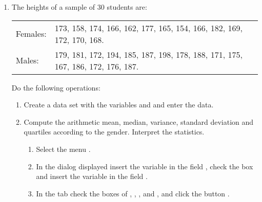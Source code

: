 \begin{enumerate}[leftmargin=*]
\item The heights of a sample of 30 students are:
\begin{center}
\begin{tabular}{ll}
Females: & 173, 158, 174, 166, 162, 177, 165, 154, 166, 182, 169, 172, 170, 168. \\
Males: & 179, 181, 172, 194, 185, 187, 198, 178, 188, 171, 175, 167, 186, 172, 176, 187.
\end{tabular}
\end{center}

Do the following operations:
\begin{enumerate}
\item Create a data set with the variables  and  and enter the data.

\item Compute the arithmetic mean, median, variance, standard deviation and quartiles according to the gender.
Interpret the statistics.
\begin{indication}
\begin{enumerate}
\item Select the menu .
\item In the dialog displayed insert the variable  in the field ,
check the box  and insert the variable  in the field .
\item In the  tab check the boxes of , ,
,  and , and click the button .
\end{enumerate}
\end{indication}
\end{enumerate}

\end{enumerate}


